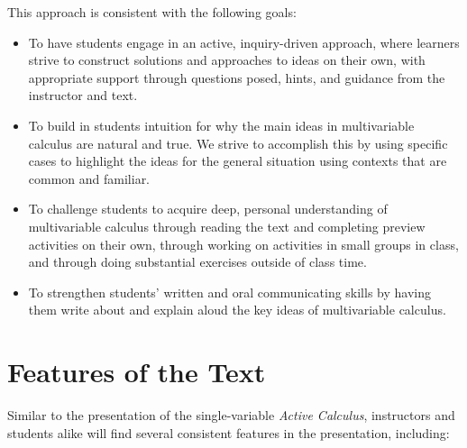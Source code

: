 This approach is consistent with the following goals:

\begin{itemize}
   \item To have students engage in an active, inquiry-driven approach, where learners strive to construct solutions and approaches to ideas on their own, with appropriate support through questions posed, hints, and guidance from the instructor and text.
   \item To build in students intuition for why the main ideas in multivariable calculus are natural and true.  We strive to accomplish this by using specific cases to highlight the ideas for the general situation using contexts that are common and familiar.
   \item To challenge students to acquire deep, personal understanding of multivariable calculus through reading the text and completing preview activities on their own, through working on activities in small groups in class, and through doing substantial exercises outside of class time.  
   \item To strengthen students' written and oral communicating skills by having them write about and explain aloud the key ideas of multivariable calculus.
\end{itemize}

\section*{Features of the Text}

Similar to the presentation of the single-variable \emph{Active Calculus}, instructors and students alike will find several consistent features in the presentation, including:

